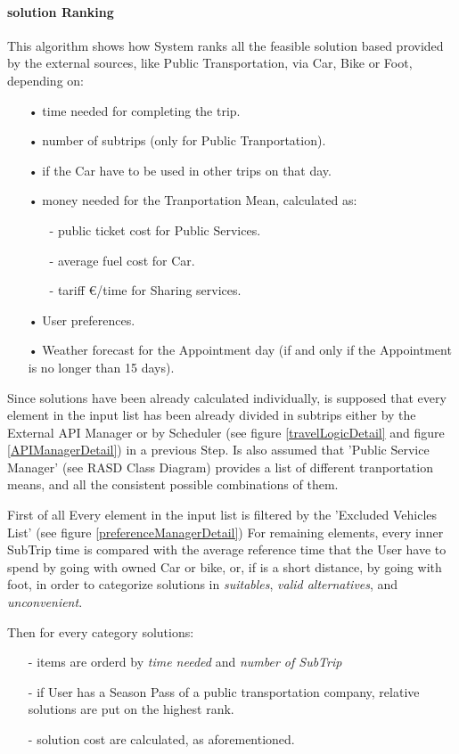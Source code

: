 \paragraph{solution Ranking}
This algorithm shows how System ranks all the feasible solution based provided by the external sources, like Public Transportation, via Car, Bike or Foot, depending on:
	\begin{itemize}
		\item[•] time needed for completing the trip.
		\item[•] number of subtrips (only for Public Tranportation).
		\item[•] if the Car have to be used in other trips on that day.
		\item[•] money needed for the Tranportation Mean, calculated as:
			\begin{itemize}
				\item[-] public ticket cost for Public Services.
				\item[-] average fuel cost for Car.
				\item[-] tariff \euro /time for Sharing services.
			\end{itemize}
		\item[•] User preferences.
		\item[•] Weather forecast for the Appointment day (if and only if the Appointment is no longer than 15 days).
	\end{itemize}
	
	Since solutions have been already calculated individually, is supposed that every element in the input list has been already divided in subtrips either by the External API Manager or by Scheduler (see figure \ref{travelLogicDetail} and figure \ref{APIManagerDetail}) in a previous Step.
	Is also assumed that 'Public Service Manager' (see RASD Class Diagram) provides a list of different tranportation means, and all the consistent possible combinations of them.
	
	First of all Every element in the input list is filtered by the 'Excluded Vehicles List' (see figure \ref{preferenceManagerDetail})
	For remaining elements, every inner SubTrip time is compared with the average reference time that the User have to spend by going with owned Car or bike, or, if is a short distance, by going with foot, in order to categorize solutions in \textit{suitables}, \textit{valid alternatives}, and \textit{unconvenient}.
	
	
	
	Then for every category solutions:
	\begin{itemize}
		\item[-] items are orderd by \textit{time needed} and \textit{number of SubTrip}
		\item[-] if User has a Season Pass of a public transportation company, relative solutions are put on the highest rank.
		\item[-] solution cost are calculated, as aforementioned.
	\end{itemize}		
		
